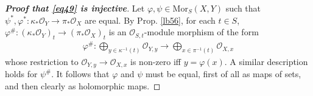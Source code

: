 \documentclass[12pt,b5paper,notitlepage]{report}
\theoremstyle{definition}
\theoremstyle{plain}
\newcommand{\scr}{\mathscr}
\newcommand{\Mor}{\mathrm{Mor}}
\numberwithin{equation}{section}
\begin{document}
\begin{proof}[\textbf{Proof that \eqref{eq49} is injective}]
Let $\varphi,\psi\in\Mor_S(X,Y)$ such that $\psi^*,\varphi^*:\kappa_*\scr O_Y\rightarrow\pi_*\scr O_X$ are equal. By Prop. \ref{lb56}, for each $t\in S$, $\varphi^\#:(\kappa_*\scr O_Y)_t\rightarrow(\pi_*\scr O_X)_t$ is an $\scr O_{S,t}$-module morphism of the form
\begin{align*}
\varphi^\#:\bigoplus_{y\in\kappa^{-1}(t)}\scr O_{Y,y}\rightarrow\bigoplus_{x\in\pi^{-1}(t)}\scr O_{X,x}
\end{align*}
whose restriction to $\scr O_{Y,y}\rightarrow\scr O_{X,x}$ is non-zero iff $y=\varphi(x)$. A similar description holds for $\psi^\#$. It follows that $\varphi$ and $\psi$ must be equal, first of all as maps of sets, and then clearly as holomorphic maps.
\end{proof}
\end{document}
